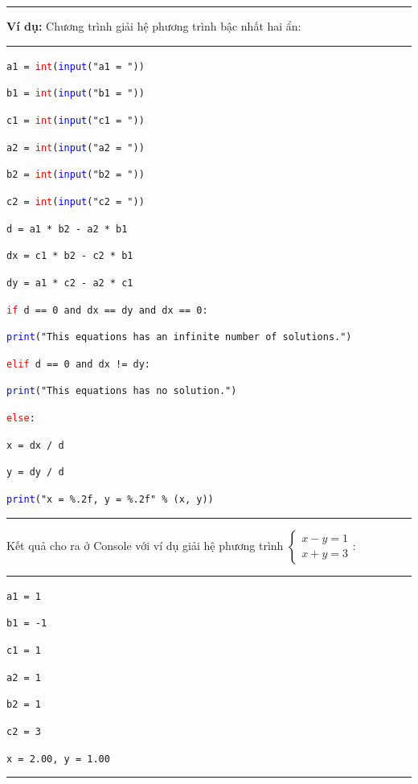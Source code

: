 \rule{\linewidth}{0.2mm}\par
\resetlinenumber
\newpage
\textbf{Ví dụ:} Chương trình giải hệ phương trình bậc nhất hai ẩn:\\
\rule{\linewidth}{0.2mm}\par
\begin{linenumbers}
	\texttt{a1 = \textcolor{red}{int}(\textcolor{blue}{input}("a1 = "))}\par
	\texttt{b1 = \textcolor{red}{int}(\textcolor{blue}{input}("b1 = "))}\par
	\texttt{c1 = \textcolor{red}{int}(\textcolor{blue}{input}("c1 = "))}\par
	\medskip
	\texttt{a2 = \textcolor{red}{int}(\textcolor{blue}{input}("a2 = "))}\par
	\texttt{b2 = \textcolor{red}{int}(\textcolor{blue}{input}("b2 = "))}\par
	\texttt{c2 = \textcolor{red}{int}(\textcolor{blue}{input}("c2 = "))}\par
	\medskip
	\texttt{d = a1 * b2 - a2 * b1}\par
	\texttt{dx = c1 * b2 - c2 * b1}\par
	\texttt{dy = a1 * c2 - a2 * c1}\par
	\medskip
	\texttt{\textcolor{red}{if} d == 0 and dx == dy and dx == 0:}\par
	\qquad \texttt{\textcolor{blue}{print}("This equations has an infinite number of solutions.")}\par
	\texttt{\textcolor{red}{elif} d == 0 and dx != dy:}\par
	\qquad \texttt{\textcolor{blue}{print}("This equations has no solution.")}\par
	\texttt{\textcolor{red}{else}:}\par
	\qquad \texttt{x = dx / d}\par
	\qquad \texttt{y = dy / d}\par
	\qquad \texttt{\textcolor{blue}{print}("x = \%.2f, y = \%.2f" \% (x, y))}\par
\end{linenumbers}
\rule{\linewidth}{0.2mm}\par
\noindent
\resetlinenumber
Kết quả cho ra ở Console với ví dụ giải hệ phương trình
$\begin{cases}
	x - y = 1\\
	x + y = 3
\end{cases}$:\par
\noindent
\rule{\linewidth}{0.2mm}\par
\begin{linenumbers}
	\texttt{a1 = 1}\par
	\texttt{b1 = -1}\par
	\texttt{c1 = 1}\par
	\texttt{a2 = 1}\par
	\texttt{b2 = 1}\par
	\texttt{c2 = 3}\par
	\texttt{x = 2.00, y = 1.00}
\end{linenumbers}
\rule{\linewidth}{0.2mm}\par
\resetlinenumber
\newpage